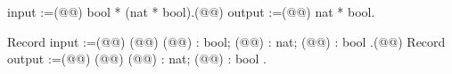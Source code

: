input :=(@\vspace{-0.04cm}@)
  bool * (nat * bool).(@\vspace{-0.04cm}@)
output :=(@\vspace{-0.04cm}@)
  nat * bool.

Record input :=(@\vspace{-0.04cm}@)
  (@@) { (@@) : bool; (@@) : nat; (@@) : bool }.(@\vspace{-0.04cm}@)
Record output :=(@\vspace{-0.04cm}@)
  (@@) { (@@) : nat; (@@) : bool }.
